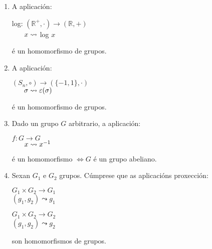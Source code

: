 \documentclass[twoside]{report}
\theoremstyle{mystyle}
\begin{document}
\begin{enumerate}
    \vspace{2mm}
    
    \item A aplicación:
    
    \begin{center}
        log: $(\mathbb{R}^{+}, \cdot)  \longrightarrow (\mathbb{R}, +) $\\
        \vspace{2mm}
        $\hspace{6mm} x \leadsto$ log $x$
    \end{center} 
    
    é un homomorfismo de grupos.
    
    \vspace{2mm}
    
    \item A aplicación: %
    
    \begin{center}
        $(S_{n}, \circ) \longrightarrow (\{-1,1\}, \cdot)$ \\
        \vspace{2mm}
        $\hspace{6mm} \sigma \leadsto \varepsilon(\sigma)$
    \end{center} 
    
    é un homomorfismo de grupos.
    
    \vspace{2mm}
    
    \item Dado un grupo $G$ arbitrario, a aplicación:
    
    \begin{center}
        $f: G \longrightarrow G$ \\
        \vspace{2mm}
        $\hspace{6mm} x \leadsto x^{-1}$
    \end{center} 
    
    é un homomorfismo $\Longleftrightarrow G$ é un grupo abeliano. 
    
    \item Sexan $G_{1}$ e $G_{2}$ grupos. Cúmprese que as aplicacións proxección:
    
    \begin{center}
        $G_{1} \times G_{2} \longrightarrow G_{1}$ \\
        \vspace{2mm}
        $(g_{1}, g_{2}) \leadsto g_{1}$
    \end{center} 
    
    \begin{center}
        $G_{1} \times G_{2} \longrightarrow G_{2}$ \\
        \vspace{2mm}
        $(g_{1}, g_{2}) \leadsto g_{2}$
    \end{center} 
    
    son homomorfismos de grupos.
    
\end{enumerate}
\end{document}
